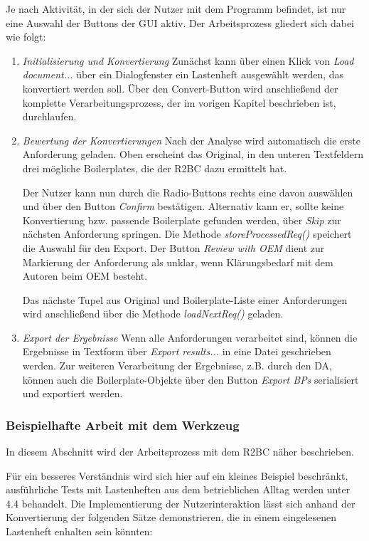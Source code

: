 \documentclass[12pt]{report}
\begin{document}
Je nach Aktivität, in der sich der Nutzer mit dem Programm befindet, ist nur eine Auswahl der Buttons der GUI aktiv. Der Arbeitsprozess gliedert sich dabei wie folgt:
\begin{enumerate}
\item \textit{Initialisierung und Konvertierung} Zunächst kann über einen Klick von \textit{Load document...} über ein Dialogfenster ein Lastenheft ausgewählt werden, das konvertiert werden soll. Über den Convert-Button wird anschließend der komplette Verarbeitungsprozess, der im vorigen Kapitel beschrieben ist, durchlaufen.
\item \textit{Bewertung der Konvertierungen} Nach der Analyse wird automatisch die erste Anforderung geladen. Oben erscheint das Original, in den unteren Textfeldern drei mögliche Boilerplates, die der R2BC dazu ermittelt hat. 

Der Nutzer kann nun durch die Radio-Buttons rechts eine davon auswählen und über den Button \textit{Confirm} bestätigen. Alternativ kann er, sollte keine Konvertierung bzw. passende Boilerplate gefunden werden, über \textit{Skip} zur nächsten Anforderung springen. Die Methode \textit{storeProcessedReq()} speichert die Auswahl für den Export. Der Button \textit{Review with OEM} dient zur Markierung der Anforderung als unklar, wenn Klärungsbedarf mit dem Autoren beim OEM besteht. 

Das nächste Tupel aus Original und Boilerplate-Liste einer Anforderungen wird anschließend über die Methode \textit{loadNextReq()} geladen.
\item \textit{Export der Ergebnisse} Wenn alle Anforderungen verarbeitet sind, können die Ergebnisse in Textform über \textit{Export results...} in eine Datei geschrieben werden. Zur weiteren Verarbeitung der Ergebnisse, z.B. durch den DA, können auch die Boilerplate-Objekte über den Button \textit{Export BPs} serialisiert und exportiert werden.
\end{enumerate}

\subsubsection{Beispielhafte Arbeit mit dem Werkzeug}
In diesem Abschnitt wird der Arbeitsprozess mit dem R2BC näher beschrieben.

Für ein besseres Verständnis wird sich hier auf ein kleines Beispiel beschränkt, ausführliche Tests mit Lastenheften aus dem betrieblichen Alltag werden unter 4.4 behandelt. Die Implementierung der Nutzerinteraktion lässt sich anhand der Konvertierung der folgenden Sätze demonstrieren, die in einem eingelesenen Lastenheft enhalten sein könnten:\\
\end{document}
